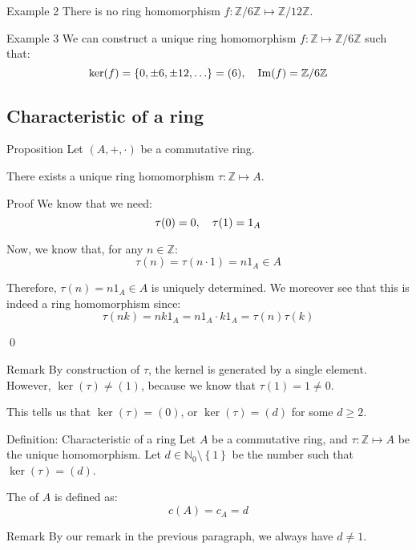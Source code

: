 \documentclass[a4paper]{article}
\begin{document}
\begin{parag}{Example 2}
    There is no ring homomorphism $f: \mathbb{Z}/6\mathbb{Z} \mapsto \mathbb{Z}/12\mathbb{Z}$.
\end{parag}

\begin{parag}{Example 3}
    We can construct a unique ring homomorphism $f: \mathbb{Z} \mapsto \mathbb{Z}/6\mathbb{Z}$ such that: 
    \[\ker\left(f\right) = \left\{0, \pm6, \pm12, \ldots\right\} = \left(6\right), \mathspace \im\left(f\right) = \mathbb{Z}/6\mathbb{Z}\]
\end{parag}


\subsection{Characteristic of a ring}

\begin{parag}{Proposition}
    Let $\left(A, +, \cdot \right)$ be a commutative ring.

    There exists a unique ring homomorphism $\tau: \mathbb{Z} \mapsto A$.

    \begin{subparag}{Proof}
        We know that we need: 
        \[\tau\left(0\right) = 0, \mathspace \tau\left(1\right) = 1_A\]
        
        Now, we know that, for any $n \in \mathbb{Z}$: 
        \[\tau\left(n\right) = \tau\left(n\cdot 1\right) = n 1_A \in A\]
        
        Therefore, $\tau\left(n\right) = n 1_A \in A$ is uniquely determined. We moreover see that this is indeed a ring homomorphism since: 
        \[\tau\left(nk\right) = nk 1_A = n 1_A \cdot  k 1_A= \tau\left(n\right)\tau\left(k\right)\]

        \qed
    \end{subparag}

    \begin{subparag}{Remark}
        By construction of $\tau$, the kernel is generated by a single element. However, $\ker\left(\tau\right) \neq \left(1\right)$, because we know that $\tau\left(1\right) = 1 \neq 0$. 

        This tells us that $\ker\left(\tau\right) = \left(0\right)$, or $\ker\left(\tau\right) = \left(d\right)$ for some $d \geq 2$.
    \end{subparag}
\end{parag}

\begin{parag}{Definition: Characteristic of a ring}
    Let $A$ be a commutative ring, and $\tau : \mathbb{Z} \mapsto A$ be the unique homomorphism. Let $d \in \mathbb{N}_0 \setminus \left\{1\right\}$ be the number such that $\ker\left(\tau\right) = \left(d\right)$.

    The  of $A$ is defined as: 
    \[c\left(A\right) = c_A = d\]

    \begin{subparag}{Remark}
        By our remark in the previous paragraph, we always have $d \neq 1$.
    \end{subparag}
\end{parag}
\end{document}
